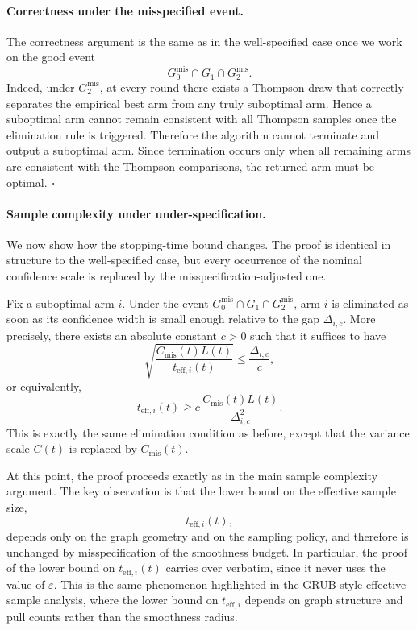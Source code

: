 \documentclass{article}
\begin{document}
\paragraph{Correctness under the misspecified event.}
The correctness argument is the same as in the well-specified case once we work
on the good event
\[
G_0^{\mathrm{mis}}\cap G_1\cap G_2^{\mathrm{mis}}.
\]
Indeed, under $G_2^{\mathrm{mis}}$, at every round there exists a Thompson draw
that correctly separates the empirical best arm from any truly suboptimal arm.
Hence a suboptimal arm cannot remain consistent with all Thompson samples once
the elimination rule is triggered. Therefore the algorithm cannot terminate and
output a suboptimal arm. Since termination occurs only when all remaining arms
are consistent with the Thompson comparisons, the returned arm must be optimal.
\hfill$\square$

\paragraph{Sample complexity under under-specification.}
We now show how the stopping-time bound changes. The proof is identical in
structure to the well-specified case, but every occurrence of the nominal
confidence scale is replaced by the misspecification-adjusted one.

Fix a suboptimal arm $i$. Under the event
$G_0^{\mathrm{mis}}\cap G_1\cap G_2^{\mathrm{mis}}$, arm $i$ is eliminated as
soon as its confidence width is small enough relative to the gap
$\Delta_{i,c}$. More precisely, there exists an absolute constant $c>0$ such
that it suffices to have
\[
\sqrt{\frac{C_{\mathrm{mis}}(t)L(t)}{t_{\mathrm{eff},i}(t)}}
\le
\frac{\Delta_{i,c}}{c},
\]
or equivalently,
\[
t_{\mathrm{eff},i}(t)
\ge
c\,\frac{C_{\mathrm{mis}}(t)L(t)}{\Delta_{i,c}^2}.
\]
This is exactly the same elimination condition as before, except that the
variance scale $C(t)$ is replaced by $C_{\mathrm{mis}}(t)$.

At this point, the proof proceeds exactly as in the main sample complexity
argument. The key observation is that the lower bound on the effective sample
size,
\[
t_{\mathrm{eff},i}(t),
\]
depends only on the graph geometry and on the sampling policy, and therefore is
unchanged by misspecification of the smoothness budget. In particular, the
proof of the lower bound on $t_{\mathrm{eff},i}(t)$ carries over verbatim,
since it never uses the value of $\varepsilon$. This is the same phenomenon
highlighted in the GRUB-style effective sample analysis, where the lower bound
on $t_{\mathrm{eff},i}$ depends on graph structure and pull counts rather than
the smoothness radius.
\end{document}
